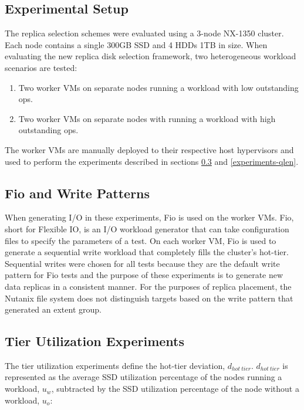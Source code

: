 \documentclass[12pt]{article}
\begin{document}
  \subsection{Experimental Setup}

  The replica selection schemes were evaluated using a 3-node NX-1350 cluster.
  Each node contains a single 300GB SSD and 4 HDDs 1TB in size. When evaluating
  the new replica disk selection framework, two heterogeneous workload
  scenarios are tested:
 
  \begin{enumerate}
    \item Two worker VMs on separate nodes running a workload with low
          outstanding ops.
    \item Two worker VMs on separate nodes with running a
          workload with high outstanding ops.
  \end{enumerate}

  The worker VMs are manually deployed to their respective host hypervisors and
  used to perform the experiments described in sections
  \ref{experiments-tier-util} and \ref{experiments-qlen}.
 
  \subsection{Fio and Write Patterns}

  When generating I/O in these experiments, Fio is used on the worker VMs. Fio,
  short for Flexible IO, is an I/O workload generator that can take
  configuration files to specify the parameters of a test. On each worker VM,
  Fio is used to generate a sequential write workload that completely fills the
  cluster's hot-tier. Sequential writes were chosen for all tests because they
  are the default write pattern for Fio tests and the purpose of these
  experiments is to generate new data replicas in a consistent manner. For the
  purposes of replica placement, the Nutanix file system does not distinguish
  targets based on the write pattern that generated an extent group.

  \subsection{Tier Utilization Experiments} \label{experiments-tier-util}

  The tier utilization experiments define the hot-tier deviation, $d_{hot\
  tier}$. $d_{hot\ tier}$ is represented as the average SSD utilization
  percentage of the nodes running a workload, $u_{w}$, subtracted by the SSD
  utilization percentage of the node without a workload, $u_{o}$:
  
\end{document}

